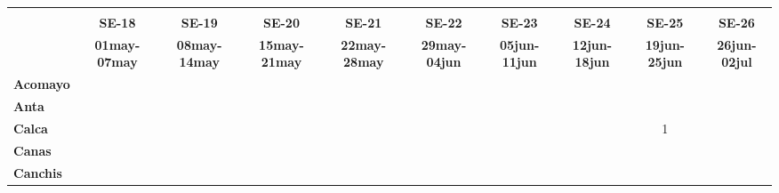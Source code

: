 \begin{tabular}{lccccccccc}
	\textbf{}              	  & \multicolumn{1}{l}{}                        & \multicolumn{1}{l}{}      & \multicolumn{1}{l}{}                         & \multicolumn{1}{l}{}                         & \multicolumn{1}{l}{}                         & \multicolumn{1}{l}{}                        & \multicolumn{1}{l}{}                         & \multicolumn{1}{l}{}                         & \multicolumn{1}{l}{}     \\
	\textbf{}                                                                          		
	&\textbf{SE-18}
	&\textbf{SE-19}								&\textbf{SE-20}	
	&\textbf{SE-21}								&\textbf{SE-22}
	&\textbf{SE-23}								&\textbf{SE-24}	
	&\textbf{SE-25}								&\textbf{SE-26}\\
	\textbf{}              	  		
	&\textbf{01may-07may}						&\textbf{08may-14may}
	&\textbf{15may-21may}						&\textbf{22may-28may}
	&\textbf{29may-04jun}						&\textbf{05jun-11jun}
	&\textbf{12jun-18jun}						&\textbf{19jun-25jun}
	&\textbf{26jun-02jul}\\
	\textbf{Acomayo}                        		
	&\cellcolor[HTML]{FCC46C}					&\cellcolor[HTML]{FCC46C}
	&\cellcolor[HTML]{FCC46C}					&\cellcolor[HTML]{FCC46C}
	&\cellcolor[HTML]{FCC46C}					&\cellcolor[HTML]{FCC46C}
	&\cellcolor[HTML]{FCC46C}					&\cellcolor[HTML]{FCC46C}
	&\cellcolor[HTML]{FCC46C}\\
	\textbf{Anta}                                                   		
	&\cellcolor[HTML]{FCC46C}					&\cellcolor[HTML]{FCC46C}
	&\cellcolor[HTML]{FCC46C}					&\cellcolor[HTML]{FCC46C}
	&\cellcolor[HTML]{FCC46C} 					&\cellcolor[HTML]{FCC46C}
	&\cellcolor[HTML]{FCC46C}					&\cellcolor[HTML]{FCC46C}
	&\cellcolor[HTML]{FCC46C}\\
	\textbf{Calca}      				       								            
	&\cellcolor[HTML]{FCC46C}		     		&\cellcolor[HTML]{FCC46C}					&\cellcolor[HTML]{FCC46C}			        &\cellcolor[HTML]{FCC46C}   				&\cellcolor[HTML]{FCC46C}					&\cellcolor[HTML]{FCC46C}					&\cellcolor[HTML]{FCC46C}					&1
	&\cellcolor[HTML]{FCC46C}\\             			
	\textbf{Canas}                              											
	&\cellcolor[HTML]{FCC46C}
	&\cellcolor[HTML]{FCC46C}					&\cellcolor[HTML]{FCC46C}
	&\cellcolor[HTML]{FCC46C} 					&\cellcolor[HTML]{FCC46C}
	&\cellcolor[HTML]{FCC46C}					&\cellcolor[HTML]{FCC46C}
	&\cellcolor[HTML]{FCC46C}					&\cellcolor[HTML]{FCC46C}\\
	\textbf{Canchis}                             											

\end{tabular}
